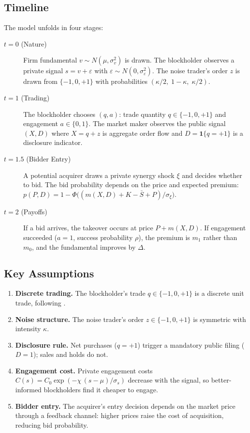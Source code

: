\documentclass[11pt,a4paper]{article}
\newcommand{\1}{\mathbf{1}}
\begin{document}
\subsection{Timeline}

The model unfolds in four stages:

\begin{description}
\item[$t=0$ (Nature)] Firm fundamental $v \sim N(\mu, \sigma_v^2)$ is drawn.
  The blockholder observes a private signal $s = v + \varepsilon$
  with $\varepsilon \sim N(0, \sigma_\varepsilon^2)$.
  The noise trader's order $z$ is drawn from $\{-1, 0, +1\}$
  with probabilities $(\kappa/2,\; 1-\kappa,\; \kappa/2)$.

\item[$t=1$ (Trading)] The blockholder chooses $(q, a)$:
  trade quantity $q \in \{-1, 0, +1\}$ and engagement $a \in \{0, 1\}$.
  The market maker observes the public signal $(X, D)$ where
  $X = q + z$ is aggregate order flow and $D = \1\{q = +1\}$
  is a disclosure indicator.

\item[$t=1.5$ (Bidder Entry)] A potential acquirer draws a private
  synergy shock $\xi$ and decides whether to bid.
  The bid probability depends on the price and expected premium:
  $p(P, D) = 1 - \Phi\bigl((m(X,D) + K - \bar{S} + P) / \sigma_\xi\bigr)$.

\item[$t=2$ (Payoffs)] If a bid arrives, the takeover occurs at
  price $P + m(X,D)$. If engagement succeeded ($a=1$, success probability
  $\rho$), the premium is $m_1$ rather than $m_0$, and the fundamental
  improves by $\Delta$.
\end{description}

\subsection{Key Assumptions}

\begin{enumerate}
\item \textbf{Discrete trading.} The blockholder's trade $q \in \{-1, 0, +1\}$
  is a discrete unit trade, following \citet{BackEtAl2018}.
\item \textbf{Noise structure.} The noise trader's order
  $z \in \{-1, 0, +1\}$ is symmetric with intensity $\kappa$.
\item \textbf{Disclosure rule.} Net purchases ($q=+1$) trigger a mandatory
  public filing ($D=1$); sales and holds do not.
\item \textbf{Engagement cost.} Private engagement costs
  $C(s) = C_0 \exp(-\chi\, (s - \mu)/\sigma_s)$ decrease with the signal,
  so better-informed blockholders find it cheaper to engage.
\item \textbf{Bidder entry.} The acquirer's entry decision depends on the
  market price through a feedback channel: higher prices raise the cost
  of acquisition, reducing bid probability.
\end{enumerate}
\end{document}
